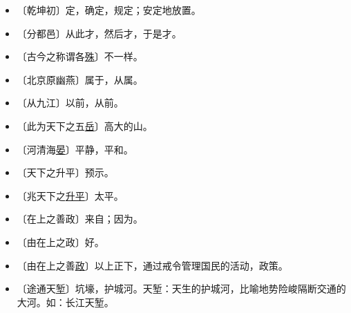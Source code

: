 \documentclass[12pt,UTF-8,openany]{ctexbook}
\begin{document}
\vspace{-1em}

\begin{itemize}
    \setlength\itemsep{-0.2em}
    \item 〔乾坤初〕定，确定，规定；安定地放置。
    \item 〔分都邑〕从此才，然后才，于是才。
    \item 〔古今之称谓各\underline{殊}〕不一样。
    \item 〔北京原幽燕〕属于，从属。
    \item 〔从九江〕以前，从前。
    \item 〔此为天下之五\underline{岳}〕高大的山。
    \item 〔河清海\underline{晏}〕平静，平和。
    \item 〔天下之升平〕预示。
    \item 〔兆天下之\underline{升平}〕太平。
    \item 〔在上之善政〕来自；因为。
    \item 〔由在上之政〕好。
    \item 〔由在上之善\underline{政}〕以上正下，通过戒令管理国民的活动，政策。
    \item 〔途通天\underline{堑}〕坑壕，护城河。天堑：天生的护城河，比喻地势险峻隔断交通的大河。如：长江天堑。
\end{itemize}
\end{document}
